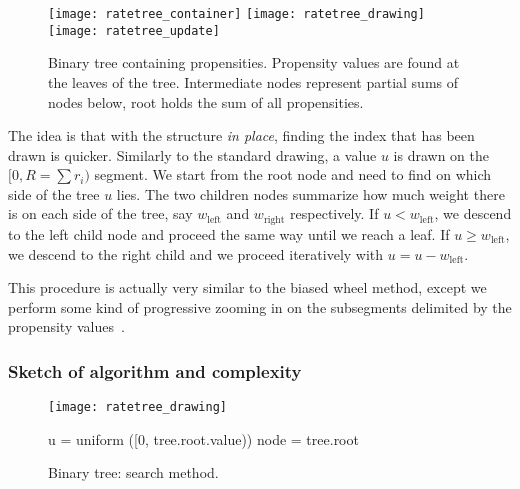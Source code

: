 \begin{figure}[!h]
  \centering
  \begin{minipage}{0.8\textwidth}
    \texttt{[image: ratetree\_container]}
    \texttt{[image: ratetree\_drawing]}
    \texttt{[image: ratetree\_update]}
  \end{minipage}
  \caption {Binary tree containing propensities. Propensity values are found at the leaves of the tree. Intermediate nodes represent partial sums of nodes below, root holds the sum of all propensities.}
  \label {fig:binary_tree}
\end {figure}

The idea is that with the structure \emph{in place}, finding the index that has been drawn is quicker. Similarly to the standard drawing, a value $u$ is drawn on the $[0, R=\sum r_i)$ segment. We start from the root node and need to find on which side of the tree $u$ lies. The two children nodes summarize how much weight there is on each side of the tree, say $w_\textrm{left}$ and $w_\textrm{right}$ respectively. If $u < w_\textrm{left}$, we descend to the left child node and proceed the same way until we reach a leaf. If $u \geq w_\textrm{left}$, we descend to the right child and we proceed iteratively with $u = u - w_\textrm{left}$.

This procedure is actually very similar to the biased wheel method, except we perform some kind of progressive zooming in on the subsegments delimited by the propensity values~.

\subsubsection {Sketch of algorithm and complexity} 
\begin{figure}[!h]
  \begin{minipage}{0.5\textwidth}
    \texttt{[image: ratetree\_drawing]}
  \end{minipage}
  \begin{minipage}{0.5\textwidth}
    \begin{algorithm}[H]
      \SetAlgoLined
      u = uniform ([0, tree.root.value))\;
        node = tree.root\;
              {
              }
    \end{algorithm}
  \end{minipage}
  \caption{Binary tree: search method.}
  \label{fig:tree_search}
\end{figure}

